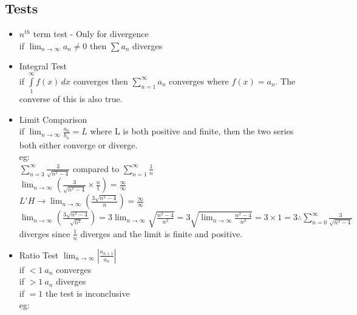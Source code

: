 \documentclass{article}
\begin{document}
  \subsection*{\color{BrickRed}Tests}
  \begin{itemize}
    \item $n^{th}$ term test - Only for divergence\\
      \subitem if \( \lim_{n\rightarrow\infty}a_n\neq0 \) then \( \sum
      a_n\) diverges\\
    \item Integral Test\\
      \subitem if \( \int\limits_{1}^{\infty} f(x) \, dx \) converges
      then \( \sum\limits_{n=1}^{\infty} a_n\) converges where \(
      f(x)=a_n\). The converse of this is also true.\\
    \item Limit Comparison\\
      \subitem if \( \lim_{n\rightarrow\infty} \frac{a_n}{b_n} = L \)
      where L is both positive and finite, then the two series
      both either converge or diverge.\\
      \subitem eg:\\
      \( \sum\limits_{n=3}^{\infty} \frac{3}{\sqrt{n^2-4}} \)
      compared to 
      \( \sum\limits_{n=1}^{\infty}\frac{1}{n} \)\\
      \( \lim_{n\rightarrow\infty}\left( \frac{3}{\sqrt{n^2-4}}
      \times \frac{n}{1} \right)=\frac{\infty}{\infty}\)\\
      \(L'H \rightarrow \lim_{n\rightarrow\infty}\left(
      \frac{3\sqrt{n^2-4}}{n} \right)=\frac{\infty}{\infty}\)\\
      \(\lim_{n\rightarrow\infty}\left(
      \frac{3\sqrt{n^2-4}}{\sqrt{n^2}} \right) =
      3\lim_{n\rightarrow\infty}\sqrt{\frac{n^2-4}{n^2}} =
      3\sqrt{\lim_{n\rightarrow\infty}\frac{n^2-4}{n^2}} =
      3 \times 1 = 3 \therefore \sum\limits_{n=0}^{\infty}
      \frac{3}{\sqrt{n^2-4}}\) diverges since \( \frac{1}{n} \)
      diverges and the limit is finite and positive.\\
    \item Ratio Test
      \subitem \(\lim_{n\rightarrow\infty}\left|
      \frac{a_{n+1}}{a_n} \right|\)\\
      if \(<1 ~ a_n\) converges\\
      if \(>1 ~ a_n\) diverges\\
      if \(=1\) the test is inconclusive\\
      \subitem eg:\\

\end{itemize}
\end{document}
